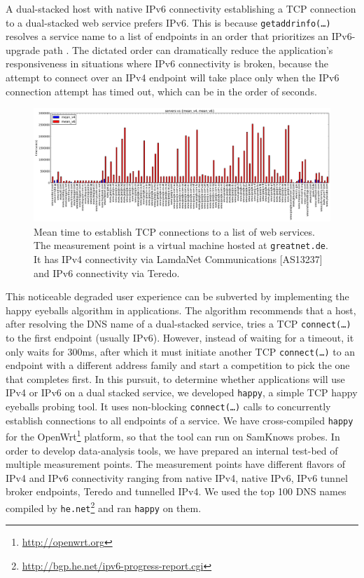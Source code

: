 A dual-stacked host with native IPv6 connectivity establishing a TCP
connection to a dual-stacked web service prefers IPv6. This is because
\texttt{getaddrinfo(\ldots)} resolves a service name to a list of endpoints in
an order that prioritizes an IPv6-upgrade path \cite{rfc6724}.  The dictated
order can dramatically reduce the application's responsiveness in situations
where IPv6 connectivity is broken, because the attempt to connect over an IPv4
endpoint will take place only when the IPv6 connection attempt has timed out,
which can be in the order of seconds.

\begin{figure}[t]
\centering
\includegraphics[width=1.0\textwidth]{figures/t28972-mean}
\caption{Mean time to establish TCP connections to a list of web services. The
measurement point is a virtual machine hosted at \texttt{greatnet.de}. It
has IPv4 connectivity via LamdaNet Communications [AS13237] and IPv6
connectivity via Teredo.}
\label{fig:t28972-mean}
\end{figure}

This noticeable degraded user experience can be subverted by implementing the
happy eyeballs algorithm \cite{rfc6555} in applications. The algorithm
recommends that a host, after resolving the DNS name of a dual-stacked
service, tries a TCP \texttt{connect(\ldots)} to the first endpoint (usually
IPv6). However, instead of waiting for a timeout, it only waits for 300ms,
after which it must initiate another TCP \texttt{connect(\ldots)} to an
endpoint with a different address family and start a competition to pick the
one that completes first.  In this pursuit, to determine whether applications
will use IPv4 or IPv6 on a dual stacked service, we developed \texttt{happy},
a simple TCP happy eyeballs probing tool. It uses non-blocking
\texttt{connect(\ldots)} calls to concurrently establish connections to all
endpoints of a service.  We have cross-compiled \texttt{happy} for the
OpenWrt\footnote{\url{http://openwrt.org}} platform, so that the tool can run
on SamKnows probes. In order to develop data-analysis tools, we have prepared
an internal test-bed of multiple measurement points. The measurement points
have different flavors of IPv4 and IPv6 connectivity ranging from native IPv4,
native IPv6, IPv6 tunnel broker endpoints, Teredo and tunnelled IPv4. We used
the top 100 DNS names compiled by
\texttt{he.net}\footnote{\url{http://bgp.he.net/ipv6-progress-report.cgi}} and
ran \texttt{happy} on them.

